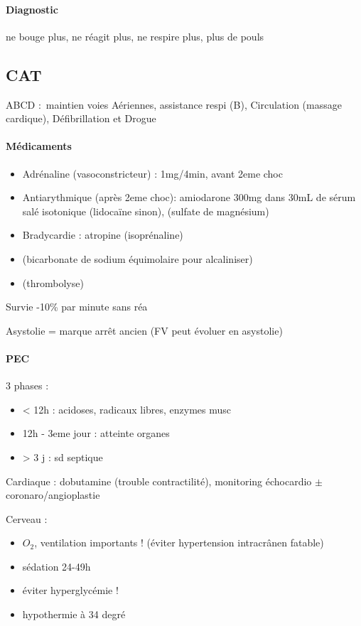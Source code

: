 \documentclass{article}
\begin{document}
\paragraph{Diagnostic} ne bouge plus, ne réagit plus, ne respire plus, plus de
pouls

\subsection{CAT}
ABCD : maintien voies Aériennes, assistance respi (B), Circulation (massage
cardique), Défibrillation et Drogue

\paragraph{Médicaments}
\begin{itemize}
  \item Adrénaline (vasoconstricteur) : 1mg/4min, avant 2eme choc
  \item Antiarythmique (après 2eme choc): amiodarone 300mg dans 30mL de sérum
    salé isotonique (lidocaïne sinon), (sulfate
    de magnésium)
  \item Bradycardie : atropine (isoprénaline)
  \item (bicarbonate de sodium équimolaire pour alcaliniser)
  \item (thrombolyse)
\end{itemize}

Survie -10\% par minute sans réa

Asystolie = marque arrêt ancien (FV peut évoluer en asystolie)

\paragraph{PEC}
3 phases :
\begin{itemize}
  \item < 12h : acidoses, radicaux libres, enzymes musc
  \item 12h - 3eme jour : atteinte organes
  \item  > 3 j : sd septique
\end{itemize}

Cardiaque : dobutamine (trouble contractilité), monitoring échocardio $\pm$
coronaro/angioplastie

Cerveau :
\begin{itemize}
  \item $O_2$, ventilation importants ! (éviter hypertension intracrânen
    fatable)
  \item sédation 24-49h
  \item éviter hyperglycémie !
  \item hypothermie à 34 degré
\end{itemize}
\end{document}
